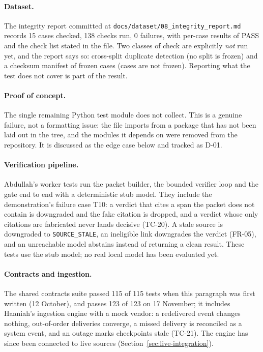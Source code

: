 \paragraph{Dataset.} The integrity report committed at
\texttt{docs/\allowbreak{}dataset/\allowbreak{}08\_\allowbreak{}integrity\_\allowbreak{}report.\allowbreak{}md} records 15 cases checked, 138
checks run, 0 failures, with per-case results of PASS and the check list stated
in the file. Two classes of check are explicitly \emph{not} run yet, and the
report says so: cross-split duplicate detection (no split is frozen) and a
checksum manifest of frozen cases (cases are not frozen). Reporting what the
test does not cover is part of the result.

\paragraph{Proof of concept.} The single remaining Python test module does not
collect. This is a genuine failure, not a formatting issue: the file imports
from a package that has not been laid out in the tree, and the modules it
depends on were removed from the repository. It is discussed as the edge case
below and tracked as D-01.

\paragraph{Verification pipeline.} Abdullah's worker tests run the packet
builder, the bounded verifier loop and the gate end to end with a deterministic
stub model. They include the demonstration's failure case T10: a verdict that
cites a span the packet does not contain is downgraded and the fake citation is
dropped, and a verdict whose only citations are fabricated never lands decisive
(TC-20). A stale source is downgraded to \texttt{SOURCE\_STALE}, an ineligible
link downgrades the verdict (FR-05), and an unreachable model abstains instead
of returning a clean result. These tests use the stub model; no real local
model has been evaluated yet.

\paragraph{Contracts and ingestion.} The shared contracts suite passed 115 of
115 tests when this paragraph was first written (12 October), and passes 123 of
123 on 17 November; it includes Haaniah's ingestion engine with a mock vendor: a
redelivered event changes nothing, out-of-order deliveries converge, a missed
delivery is reconciled as a system event, and an outage marks checkpoints stale
(TC-21). The engine has since been connected to live sources
(Section~\ref{sec:live-integration}).

